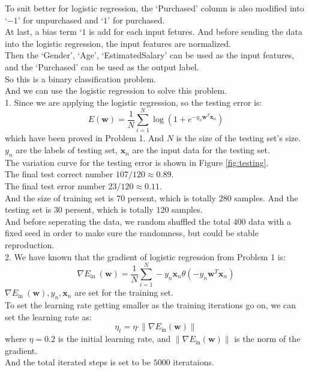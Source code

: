 To suit better for logistic regression, the `Purchased' column is also modified into `$-1$' for unpurchased and `$1$' for purchased.\\
At last, a bias term `$1$ is add for each input fetures. 
And before sending the data into the logistic regression, the input features are normalized.\\

Then the `Gender', `Age', `EstimatedSalary' can be used as the input features, and the `Purchased' can be used as the output label.\\
So this is a binary classification problem.\\
And we can use the logistic regression to solve this problem.\\

1. Since we are applying the logistic regression, so the testing error is:
$$E(\mathbf{w}) = \dfrac{1}{N}\sum_{i=1}^{N}\log (1+e^{-y_n\mathbf{w}^T\mathbf{x}_n})$$
which have been proved in Problem 1. And $N$ is the size of the testing set's size. $y_n$ are the labels of
testing set, $\mathbf{x}_n$ are the input data for the testing set.\\
The variation curve for the testing error is shown in Figure \ref{fig:testing}.\\

The final test correct number $107 / 120\approx 0.89$.\\
The final test error number $23 / 120\approx 0.11$.\\

And the size of training set is $70$ persent, which is totally $280$ samples. And the testing set is $30$ persent, which is totally $120$ samples.\\
And before seperating the data, we random shuffled the total $400$ data with a fixed seed in order to make sure the randomness, but could be stable reproduction.\\

2. We have known that the gradient of logistic regression from Problem 1 is:
$$\nabla E_{\text {in }}(\mathbf{w}) = \dfrac{1}{N}\sum_{i=1}^{N}-y_n\mathbf{x}_n\theta(-y_n\mathbf{w}^T\mathbf{x}_n)$$
$\nabla E_{\text {in }}(\mathbf{w}),y_n,\mathbf{x}_n$ are set for the training set.\\
To set the learning rate getting smaller as the training iterations go on, we can set the learning rate as:
$$\eta_t = \eta\cdot \|\nabla E_{\text{in}}(\mathbf{w})\|$$
where $\eta=0.2$ is the initial learning rate, and $\|\nabla E_{\text{in}}(\mathbf{w})\|$ is the norm of the gradient.\\
And the total iterated steps is set to be $5000$ iterataions.\\ 


